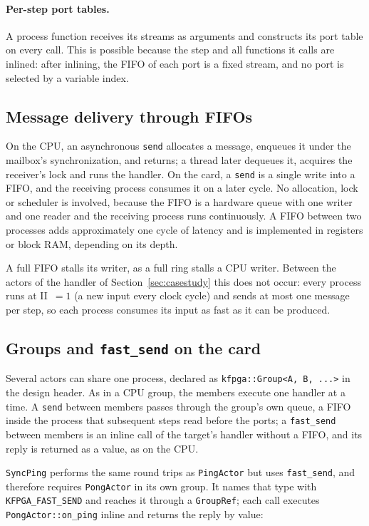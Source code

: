 \documentclass[11pt]{article}
\newcommand{\fs}{\texttt{fast\_send}}
\newcommand{\snd}{\texttt{send}}
\begin{document}
\paragraph{Per-step port tables.} A process function receives its
streams as arguments and constructs its port table on every call. This is
possible because the step and all functions it calls are inlined: after
inlining, the FIFO of each port is a fixed stream, and no port is selected by a
variable index.

\subsection{Message delivery through FIFOs}
\label{sec:delivery}

On the CPU, an asynchronous \snd{} allocates a message, enqueues it under the
mailbox's synchronization, and returns; a thread later dequeues it, acquires the
receiver's lock and runs the handler. On the card, a \snd{} is a single write
into a FIFO, and the receiving process consumes it on a later cycle. No
allocation, lock or scheduler is involved, because the FIFO is a hardware queue
with one writer and one reader and the receiving process runs continuously. A
FIFO between two processes adds approximately one cycle of latency and is
implemented in registers or block RAM, depending on its depth.

A full FIFO stalls its writer, as a full ring stalls a CPU writer. Between the
actors of the handler of Section~\ref{sec:casestudy} this does not occur: every
process runs at II~$=1$ (a new input every clock cycle) and sends at most one message per step, so each process
consumes its input as fast as it can be produced.

\subsection{Groups and \fs{} on the card}
\label{sec:fpgagroups}

Several actors can share one process, declared as
\texttt{kfpga::Group<A,~B,~...>} in the design header. As in a CPU group, the
members execute one handler at a time. A \snd{} between members passes through
the group's own queue, a FIFO inside the process that subsequent steps read
before the ports; a \fs{} between members is an inline call of the target's
handler without a FIFO, and its reply is returned as a value, as on the CPU.

\texttt{SyncPing} performs the same round trips as \texttt{PingActor} but uses
\fs{}, and therefore requires \texttt{PongActor} in its own group. It names
that type with \texttt{KFPGA\_FAST\_SEND} and reaches it through a
\texttt{GroupRef}; each call executes \texttt{PongActor::on\_ping} inline and
returns the reply by value:
\end{document}
